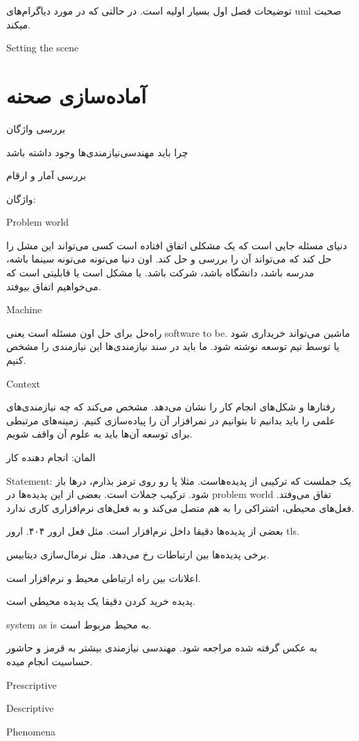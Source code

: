 توضیحات فصل اول بسیار اولیه است. در حالتی که در مورد دیاگرام‌های uml صحبت میکند.

Setting the scene

\section{آماده‌سازی صحنه}

بررسی واژگان

چرا باید مهندسی‌نیازمندی‌ها وجود داشته باشد

بررسی آمار و ارقام

واژگان:

Problem world

دنیای مسئله جایی است که یک مشکلی اتفاق افتاده است کسی می‌تواند این مشل را حل کند
که می‌تواند آن را بررسی و حل کند. اون دنیا می‌تونه می‌تونه سینما باشه، مدرسه
باشد، دانشگاه باشد، شرکت باشد. یا مشکل است یا قابلیتی است که می‌خواهیم اتفاق
بیوفتد.

Machine

راه‌حل برای حل اون مسئله است یعنی software to be. ماشین می‌تواند خریداری شود یا
توسط تیم توسعه نوشته شود. ما باید در سند نیازمندی‌ها این نیازمندی را مشخص کنیم.

Context

رفتار‌ها و شکل‌های انجام کار را نشان می‌دهد. مشخص می‌کند که چه نیازمندی‌های علمی
را باید بدانیم تا بتوانیم در نمر‌افزار آن را پیاده‌سازی کنیم. زمینه‌های مرتبطی
برای توسعه‌ آن‌ها باید به علوم آن واقف شویم.

المان: انجام دهنده کار

Statement: یک جملست که ترکیبی از پدیده‌هاست. مثلا پا رو روی ترمز بذارم، در‌ها
باز شود. ترکیب جملات است. بعضی از این پدیده‌ها در problem world تفاق می‌وفتد.
فعل‌های محیطی، اشتراکی را به هم متصل می‌کند و به فعل‌های نرم‌افزاری کاری ندارد.

بعضی از پدیده‌ها دقیقا داخل نرم‌افزار است. مثل فعل ارور ۴۰۴. ارور tls.

برخی پدیده‌ها بین ارتباطات رخ می‌دهد. مثل نرمال‌سازی دیتابیس.

اعلانات بین راه ارتباطی محیط و نرم‌افزار است.

پدیده خرید کردن دقیقا یک پدیده محیطی است.

system as is به محیط مربوط است.

به عکس گرفته شده مراجعه شود. مهندسی نیازمندی بیشتر به قرمز و حاشور حساسیت انجام
میده.

Prescriptive

Descriptive

Phenomena

